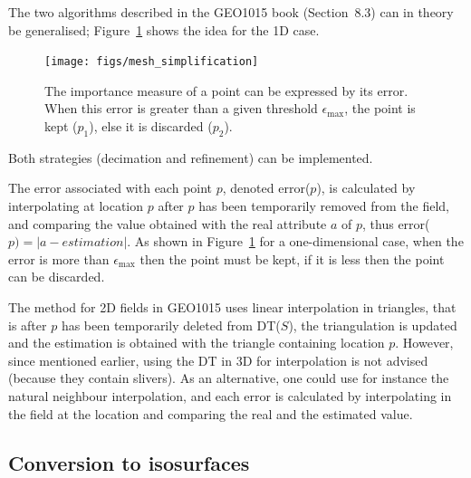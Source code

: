 %

The two algorithms described in the GEO1015 book (Section~8.3) can in theory be generalised; Figure~\ref{fig:meshsimplification} shows the idea for the 1D case.
\begin{figure}
  \centering
  \texttt{[image: figs/mesh\_simplification]}
  \caption{The importance measure of a point can be expressed by its error. When this error is greater than a given threshold $\epsilon_{\max}$, the point is kept ($p_1$), else it is discarded ($p_2$).}%
\label{fig:meshsimplification}
\end{figure}
Both strategies (decimation and refinement) can be implemented.

The error associated with each point $p$, denoted error($p$), is calculated by interpolating at location $p$ after $p$ has been temporarily removed from the field, and comparing the value obtained with the real attribute $a$ of $p$, thus error($p) = |a - estimation|$. 
As shown in Figure~\ref{fig:meshsimplification} for a one-dimensional case, when the error is more than $\epsilon_{\max}$ then the point must be kept, if it is less then the point can be discarded.

The method for 2D fields in GEO1015 uses linear interpolation in triangles, that is after $p$ has been temporarily deleted from DT($S$), the triangulation is updated and the estimation is obtained with the triangle containing location $p$. 
However, since mentioned earlier, using the DT in 3D for interpolation is not advised (because they contain slivers).
As an alternative, one could use for instance the natural neighbour interpolation, and each error is calculated by interpolating in the field at the location and comparing the real and the estimated value.


\subsection{Conversion to isosurfaces}

